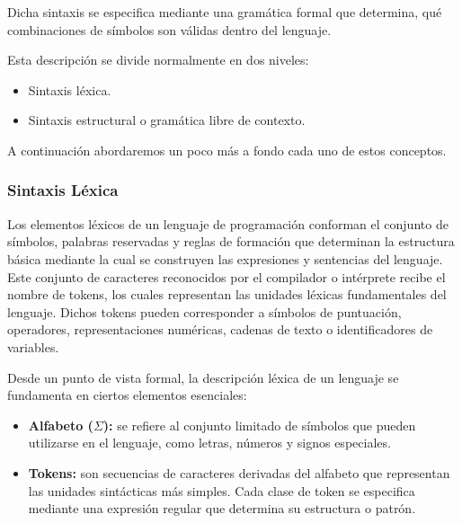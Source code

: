 \documentclass[a4paper,12pt]{article}
\begin{document}
Dicha sintaxis se especifica mediante una gramática formal que determina, qué combinaciones de símbolos son válidas dentro del lenguaje.

Esta descripción se divide normalmente en dos niveles:

\begin{itemize}
    \item Sintaxis léxica.
    \item Sintaxis estructural o gramática libre de contexto.
\end{itemize}

A continuación abordaremos un poco más a fondo cada uno de estos conceptos.

\subsubsection{Sintaxis Léxica}
Los elementos léxicos de un lenguaje de programación conforman el conjunto de símbolos, palabras reservadas y reglas de formación que determinan la estructura básica mediante la cual se construyen las expresiones y sentencias del lenguaje.
Este conjunto de caracteres reconocidos por el compilador o intérprete recibe el nombre de tokens, los cuales representan las unidades léxicas fundamentales del lenguaje. Dichos tokens pueden corresponder a símbolos de puntuación, operadores, representaciones numéricas, cadenas de texto o identificadores de variables.

Desde un punto de vista formal, la descripción léxica de un lenguaje se fundamenta en ciertos elementos esenciales:

\begin{itemize}
    \item \textbf{Alfabeto ($\Sigma$):} se refiere al conjunto limitado de símbolos que pueden utilizarse en el lenguaje, como letras, números y signos especiales.
    \item \textbf{Tokens:} son secuencias de caracteres derivadas del alfabeto que representan las unidades sintácticas más simples. Cada clase de token se especifica mediante una expresión regular que determina su estructura o patrón.
\end{itemize}
\end{document}
